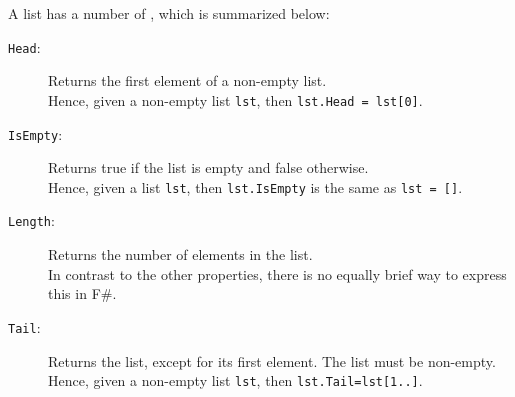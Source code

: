 \documentclass[fsharpNotes.tex]{subfiles}
\begin{document}
A list has a number of , which is summarized below:
\begin{description}
\item[\texttt{Head}:] Returns the first element of a non-empty list.
  ~\\
  Hence, given a non-empty list \lstinline{lst}, then \lstinline{lst.Head = lst[0]}.
\item[\texttt{IsEmpty}:] Returns true if the list is empty and false otherwise.
  ~\\
  Hence, given a list \lstinline{lst}, then \lstinline{lst.IsEmpty} is the same as \lstinline{lst = []}.
\item[\texttt{Length}:] Returns the number of elements in the list.
  ~\\
  In contrast to the other properties, there is no equally brief way to express this in F\#.
\item[\texttt{Tail}:] Returns the list, except for its first element. The list must be non-empty.
  ~\\
  Hence, given a non-empty list \lstinline{lst}, then \lstinline{lst.Tail=lst[1..]}.
\end{description}

\end{document}
